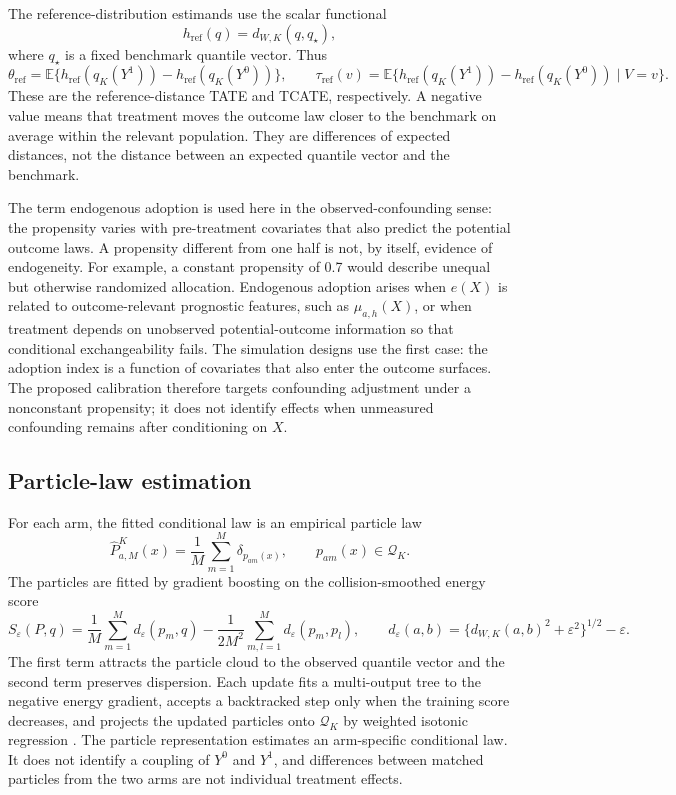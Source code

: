The reference-distribution estimands use the scalar functional
\[
 h_{\mathrm{ref}}(q)=d_{W,K}(q,q_\star),
\]
where $q_\star$ is a fixed benchmark quantile vector. Thus
\[
 \theta_{\mathrm{ref}}=\mathbb{E}\{h_{\mathrm{ref}}(q_K(Y^1))
 -h_{\mathrm{ref}}(q_K(Y^0))\},\qquad
 \tau_{\mathrm{ref}}(v)=\mathbb{E}\{h_{\mathrm{ref}}(q_K(Y^1))
 -h_{\mathrm{ref}}(q_K(Y^0))\mid V=v\}.
\]
These are the reference-distance TATE and TCATE, respectively. A negative
value means that treatment moves the outcome law closer to the benchmark on
average within the relevant population. They are differences of expected
distances, not the distance between an expected quantile vector and the
benchmark.

The term endogenous adoption is used here in the observed-confounding sense:
the propensity varies with pre-treatment covariates that also predict the
potential outcome laws. A propensity different from one half is not, by
itself, evidence of endogeneity. For example, a constant propensity of 0.7
would describe unequal but otherwise randomized allocation. Endogenous
adoption arises when $e(X)$ is related to outcome-relevant prognostic
features, such as $\mu_{a,h}(X)$, or when treatment depends on unobserved
potential-outcome information so that conditional exchangeability fails. The
simulation designs use the first case: the adoption index is a function of
covariates that also enter the outcome surfaces. The proposed calibration
therefore targets confounding adjustment under a nonconstant propensity; it
does not identify effects when unmeasured confounding remains after
conditioning on $X$.

\subsection{Particle-law estimation}\label{sec:boosting}

For each arm, the fitted conditional law is an empirical particle law
\[
 \widehat P_{a,M}^K(x)=\frac{1}{M}\sum_{m=1}^{M}\delta_{p_{am}(x)},
 \qquad p_{am}(x)\in\mathcal{Q}_K.
\]
The particles are fitted by gradient boosting \citep{friedman2001greedy} on the collision-smoothed
energy score
\[
 S_\varepsilon(P,q)=\frac{1}{M}\sum_{m=1}^{M}d_{\varepsilon}(p_m,q)
 -\frac{1}{2M^2}\sum_{m,l=1}^{M}d_{\varepsilon}(p_m,p_l),
 \qquad
 d_{\varepsilon}(a,b)=\{d_{W,K}(a,b)^2+\varepsilon^2\}^{1/2}-\varepsilon.
\]
The first term attracts the particle cloud to the observed quantile vector and
the second term preserves dispersion. Each update fits a multi-output tree to
the negative energy gradient, accepts a backtracked step only when the
training score decreases, and projects the updated particles onto
$\mathcal{Q}_K$ by weighted isotonic regression \citep{barlow1972isotonic}. The particle representation
estimates an arm-specific conditional law. It does not identify a coupling of
$Y^0$ and $Y^1$, and differences between matched particles from the two arms
are not individual treatment effects.

